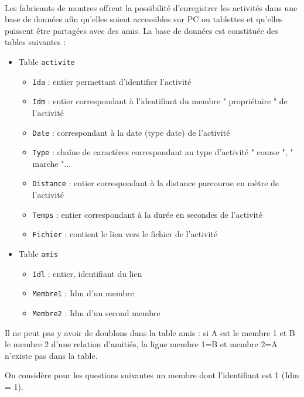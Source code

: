 \documentclass[11pt,a4paper]{article}
\begin{document}
\begin{Exercise}[title = {Résultats de requêtes},origin = {\bac\; {\sc ccinp psi 2021}}]\\
	Les fabricants de montres offrent la possibilité d’enregistrer les activités dans une base de données afin qu’elles soient accessibles sur PC ou tablettes et qu’elles puissent être partagées avec des amis. La base de données est constituée des tables suivantes :
	\begin{itemize}
		\item[\textbullet] Table {\tt activite}
			\begin{itemize}
				\item {\tt Ida} : entier permettant d’identifier l’activité
				\item {\tt Idm} : entier correspondant à l’identifiant du membre " propriétaire " de l’activité
				\item {\tt Date} : correspondant à la date (type date) de l’activité
				\item {\tt Type} : chaîne de caractères correspondant au type d’activité " course ", " marche "...
				\item {\tt Distance} : entier correspondant à la distance parcourue en mètre de l’activité
				\item {\tt Temps} : entier correspondant à la durée en secondes de l’activité
				\item {\tt Fichier} : contient le lien vers le fichier de l’activité
			\end{itemize}
		\item[\textbullet] Table {\tt amis}
			\begin{itemize}
				\item {\tt Idl} : entier, identifiant du lien
				\item {\tt Membre1} : Idm d’un membre
				\item {\tt Membre2} : Idm d’un second membre
			\end{itemize}

	\end{itemize}

	Il ne peut pas y avoir de doublons dans la table amis : si A est le membre 1 et B le membre 2 d’une  relation d’amitiés, la ligne membre 1=B et membre 2=A n’existe pas dans la table.

	On considère pour les questions suivantes un membre dont l’identifiant est 1 (Idm = 1).


\end{Exercise}
\end{document}

